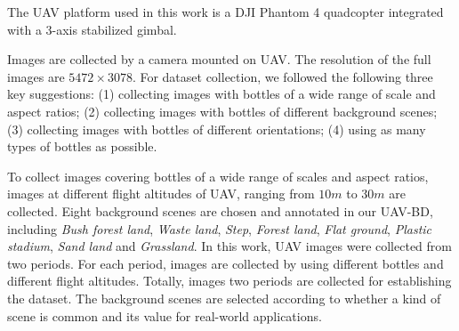 %	
%	
%	



The UAV platform used in this work is a DJI Phantom 4 quadcopter integrated with a 3-axis stabilized gimbal.

Images are collected by a camera mounted on UAV. The resolution of the full images are $ 5472\times 3078 $. For dataset collection, we followed the following three key suggestions: (1) collecting images with bottles of a wide range of scale and aspect ratios; (2) collecting images with bottles of different background scenes; (3) collecting images with bottles of different orientations; (4) using as many types of bottles as possible. 


To collect images covering bottles of a wide range of scales and aspect ratios, images at different flight altitudes of UAV, ranging from $ 10m $ to $ 30m $ are collected. Eight background scenes are chosen and annotated in our UAV-BD, including \textit{Bush forest land}, \textit{Waste land}, \textit{Step}, \textit{Forest land}, \textit{Flat ground}, \textit{Plastic stadium}, \textit{Sand land} and \textit{Grassland}. In this work, UAV images were collected from two periods. For each period, images are collected by using different bottles and different flight altitudes. Totally, images two periods are collected for establishing the dataset. The background scenes are selected according to whether a kind of scene is common and its value for real-world applications\cite{DOTA}.

